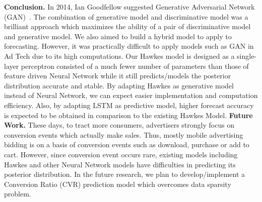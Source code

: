 \documentclass[10pt,letterpaper]{article}
\newlength\savedwidth
\newcommand\thickhline{\noalign{\global\savedwidth\arrayrulewidth\global\arrayrulewidth 2pt}%
\hline
\noalign{\global\arrayrulewidth\savedwidth}}
\begin{document}
\textbf{Conclusion.	}
In 2014, Ian Goodfellow suggested Generative Adversarial  Network (GAN)~\cite{bib27}. The combination of generative model and discriminative model was a brilliant approach which maximizes the ability of a pair of discriminative model and generative model. We also aimed to build a hybrid model to apply to forecasting. However, it was practically difficult to apply models such as GAN in Ad Tech due to its high computations. Our Hawkes model is designed as a single-layer perceptron consisted of a much fewer number of parameters than those of feature driven Neural Network while it still predicts/models the posterior distribution accurate and stable. By adapting Hawkes as generative model instead of Neural Network, we can expect easier implementation and computation efficiency. Also, by adapting LSTM as predictive model, higher forecast accuracy is expected to be obtained in comparison to the existing Hawkes Model.\newline\newline
\textbf{Future Work.	}	These days, to tract more consumers, advertisers strongly focus on conversion events which actually make sales. Thus, mostly mobile advertising bidding is on a basis of conversion events such as download, purchase or add to cart. However, since conversion event occurs rare, existing models including Hawkes and other Neural Network models have difficulties in predicting its posterior distribution.
In the future research, we plan to develop/implement a Conversion Ratio (CVR) prediction model which overcomes data sparsity problem.
 

\end{document}
